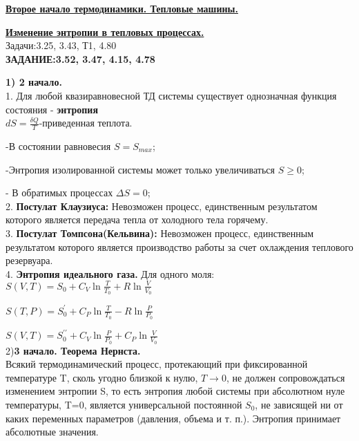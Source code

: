 \documentclass[12pt]{article}
\begin{document}
{\underline{\bf Второе начало термодинамики. Тепловые машины.}

{\underline{\bf Изменение энтропии в тепловых процессах.}\\

Задачи:3.25, 3.43, Т1, 4.80 \\

{\bf ЗАДАНИЕ:3.52, 3.47, 4.15, 4.78}

\vspace{0.5cm}

{\bf 1) 2 начало.}\\

1. Для любой квазиравновесной ТД системы существует однозначная функция состояния - {\bf энтропия}\\

$dS=\frac{\delta Q}{T}$-приведенная теплота.

-В состоянии равновесия $S=S_{max}$;

-Энтропия изолированной системы может только увеличиваться $S\geq0$;

- В обратимых процессах $\Delta S=0$;\\

2. {\bf Постулат Клаузиуса:} Невозможен процесс, единственным результатом которого является передача тепла от холодного тела горячему.\\

3. {\bf Постулат Томпсона(Кельвина):} Невозможен процесс, единственным результатом которого является производство работы за счет охлаждения теплового резервуара.\\

4. {\bf Энтропия идеального газа.} Для одного моля:\\

$S(V,T)=S_0+C_V\ln\frac{T}{T_0}+R\ln\frac{V}{V_0}$

$S(T,P)=S^\prime_0+C_P\ln\frac{T}{T_0}-R\ln\frac{P}{P_0}$

$S(V,T)=S^{\prime\prime}_0+C_V\ln\frac{P}{P_0}+C_P\ln\frac{V}{V_0}$\\

2){\bf 3 начало. Теорема Нернста.}\\

Всякий термодинамический процесс, протекающий при фиксированной температуре T, сколь угодно близкой к нулю, {$T\to 0$}, не должен сопровождаться изменением энтропии S, то есть энтропия любой системы при абсолютном нуле температуры, T=0, является универсальной постоянной $S_{0}$, не зависящей ни от каких переменных параметров (давления, объема и т. п.). Энтропия принимает абсолютные значения.

}}
\end{document}
